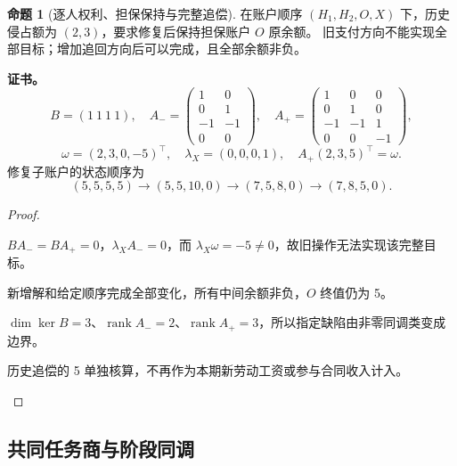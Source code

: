 \documentclass[UTF8,12pt,a4paper,openany,fontset=none,zihao=false]{ctexrep}
\theoremstyle{definition}
\newtheorem{proposition}{命题}[chapter]
\newenvironment{certificate}{\par\noindent\textbf{证书。}\ignorespaces}{\par}
\DeclareMathOperator{\rank}{rank}
\newcommand{\1}{\mathbf 1}
\begin{document}
\begin{proposition}[逐人权利、担保保持与完整追偿]
在账户顺序 \((H_1,H_2,O,X)\) 下，历史侵占额为 \((2,3)\)，要求修复后保持担保账户 \(O\) 原余额。
旧支付方向不能实现全部目标；增加追回方向后可以完成，且全部余额非负。
\end{proposition}
\begin{certificate}
\[
B=(1\ 1\ 1\ 1),\quad
A_-=\begin{pmatrix}1&0\\0&1\\-1&-1\\0&0\end{pmatrix},\quad
A_+=\begin{pmatrix}1&0&0\\0&1&0\\-1&-1&1\\0&0&-1\end{pmatrix},
\]
\[
\omega=(2,3,0,-5)^\top,
\quad\lambda_X=(0,0,0,1),
\quad A_+(2,3,5)^\top=\omega.
\]
修复子账户的状态顺序为
\[
(5,5,5,5)\longrightarrow(5,5,10,0)
\longrightarrow(7,5,8,0)\longrightarrow(7,8,5,0).
\]
\end{certificate}
\begin{proof}
\begin{semanticsteps}
\item \(BA_-=BA_+=0\)，\(\lambda_XA_-=0\)，而 \(\lambda_X\omega=-5\ne0\)，故旧操作无法实现该完整目标。
\item 新增解和给定顺序完成全部变化，所有中间余额非负，\(O\) 终值仍为 5。
\item \(\dim\ker B=3\)、\(\rank A_-=2\)、\(\rank A_+=3\)，所以指定缺陷由非零同调类变成边界。
\item 历史追偿的 5 单独核算，不再作为本期新劳动工资或参与合同收入计入。
\end{semanticsteps}
\end{proof}

\subsection{共同任务商与阶段同调}
\end{document}
